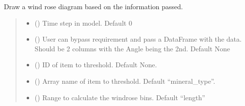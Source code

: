\documentclass[letterpaper,10pt,english]{sphinxmanual}
\begin{document}
\begin{fulllineitems}
\begin{fulllineitems}
\end{fulllineitems}


\begin{fulllineitems}
\label{\detokenize{openfdem:openfdem.openfdem.Model.draw_rose_diagram}}
\pysigstartsignatures
{}
\pysigstopsignatures
\sphinxAtStartPar
Draw a wind rose diagram based on the information passed.
\begin{quote}\begin{description}
\begin{itemize}
\item {} 
\sphinxAtStartPar
{} () \textendash{} Time step in model. Default 0

\item {} 
\sphinxAtStartPar
{} () \textendash{} User can bypass requirement and pass a DataFrame with the data. Should be 2 columns with the Angle being the 2nd. Default None

\item {} 
\sphinxAtStartPar
{} () \textendash{} ID of item to threshold. Default None.

\item {} 
\sphinxAtStartPar
{} () \textendash{} Array name of item to threshold. Default “mineral\_type”.

\item {} 
\sphinxAtStartPar
{} () \textendash{} Range to calculate the windrose bins. Default “length”


\end{itemize}
\end{description}
\end{quote}
\end{fulllineitems}
\end{fulllineitems}
\end{document}
